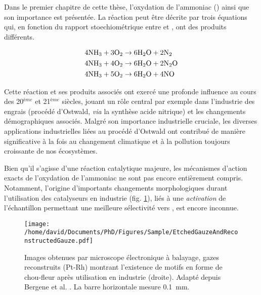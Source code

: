 \begingroup
\renewcommand{\tablename}{Tableau} %

Dans le premier chapitre de cette thèse, l'oxydation de l'ammoniac () ainsi que son importance est présentée.
La réaction peut être décrite par trois équations qui, en fonction du rapport stoechiométrique entre  et , ont des produits différents.

\begin{align}
    \label{eq:AmmoniaOxidationNitrogenFr}
    4 \ammonia + 3 \ce{O_2} & \rightarrow 6 \water + 2 \nitrogen \\
    \label{eq:AmmoniaOxidationNitrousOxideFr}
    4 \ammonia + 4 \ce{O_2} & \rightarrow 6 \water + 2 \nitrousoxide \\
    \label{eq:AmmoniaOxidationNitricOxideFr}
    4 \ammonia + 5 \ce{O_2} & \rightarrow 6 \water + 4 \nitricoxide
\end{align}

Cette réaction et ses produits associés ont exercé une profonde influence au cours des 20$^{ème}$ et 21$^{ème}$ siècles, jouant un rôle central par exemple dans l'industrie des engrais (procédé d'Ostwald, \textit{via} la synthèse acide nitrique) et les changements démographiques associés.
Malgré son importance industrielle cruciale, les diverses applications industrielles liées au procédé d'Ostwald ont contribué de manière significative à la fois au changement climatique et à la pollution toujours croissante de nos écosystèmes.

Bien qu’il s’agisse d’une réaction catalytique majeure, les mécanismes d’action exacts de l'oxydation de l'ammoniac ne sont pas encore entièrement compris.
Notamment, l'origine d'importants changements morphologiques durant l'utilisation des catalyseurs en industrie (fig. \ref{fig:GauzesFr}), liés à une \textit{activation} de l'échantillon permettant une meilleure sélectivité vers , est encore inconnue.

\begin{figure}[!htb]
    \centering
    \texttt{[image: /home/david/Documents/PhD/Figures/Sample/EtchedGauzeAndReconstructedGauze.pdf]}
    \caption{
    Images obtenues par microscope électronique à balayage, gazes reconstruits (Pt-Rh) montrant l'existence de motifs en forme de chou-fleur après utilisation en industrie (droite).
    Adapté depuis Bergene et al. \parencite*{Bergene1996}.
    La barre horizontale mesure \qty{0.1}{\mm}.
    }
    \label{fig:GauzesFr}
\end{figure}

